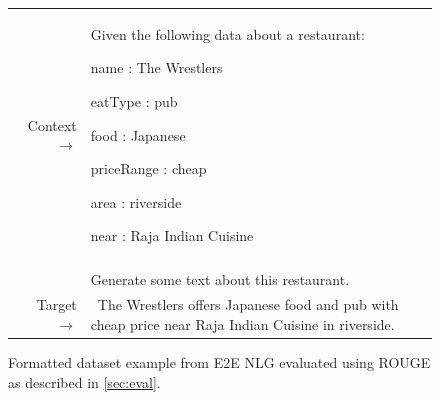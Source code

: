 \documentclass{article}
\begin{document}
\begin{figure}[!h] { \tt \footnotesize \begin{tabularx}{\linewidth}{r X} \toprule Context $\to$ & Given the following data about a restaurant:

name : The Wrestlers

eatType : pub

food : Japanese

priceRange : cheap

area : riverside

near : Raja Indian Cuisine\\
& \\
& Generate some text about this restaurant.\\
\midrule 
Target $\to$ & ~The Wrestlers offers Japanese food and pub with cheap price near Raja Indian Cuisine in riverside.\\
\bottomrule \end{tabularx} }
\caption{Formatted dataset example from E2E NLG evaluated using ROUGE as described in \autoref{sec:eval}.}
\label{eval:e2enlg}  
\end{figure}
\end{document}
